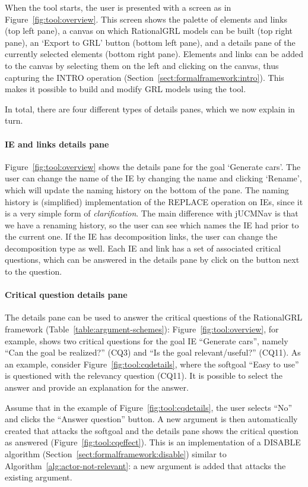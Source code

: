 When the tool starts, the user is presented with a screen as in Figure~\ref{fig:tool:overview}. This screen shows the palette of elements and links (top left pane), a canvas on which RationalGRL models can be built (top right pane), an `Export to GRL' button (bottom left pane), and a details pane of the currently selected elements (bottom right pane). Elements and links can be added to the canvas by selecting them on the left and clicking on the canvas, thus capturing the \textsf{INTRO} operation (Section~\ref{sect:formalframework:intro}). This makes it possible to build and modify GRL models using the tool. 

In total, there are four different types of details panes, which we now explain in turn.

\paragraph{IE and links details pane} Figure~\ref{fig:tool:overview} shows the details pane for the goal `Generate cars'. The user can change the name of the IE by changing the name and clicking `Rename', which will update the naming history on the bottom of the pane. The naming history is (simplified) implementation of the \textsf{REPLACE} operation on IEs, since it is a very simple form of \emph{clarification}. The main difference with jUCMNav is that we have a renaming history, so the user can see which names the IE had prior to the current one. If the IE has decomposition links, the user can change the decomposition type as well. Each IE and link has a set of associated critical questions, which can be answered in the details pane by click on the button next to the question.

\paragraph{Critical question details pane} The details pane can be used to answer the critical questions of the RationalGRL framework (Table~\ref{table:argument-schemes}): Figure~\ref{fig:tool:overview}, for example, shows two critical questions for the goal IE ``Generate cars'', namely ``Can the goal be realized?'' (CQ3) and ``Is the goal relevant/useful?'' (CQ11). As an example, consider Figure~\ref{fig:tool:cqdetails}, where the softgoal ``Easy to use'' is questioned with the relevancy question (CQ11). It is possible to select the answer and provide an explanation for the answer. 

Assume that in the example of Figure~\ref{fig:tool:cqdetails}, the user selects ``No'' and clicks the ``Answer question'' button. A new argument is then automatically created that attacks the softgoal and the details pane shows the critical question as answered (Figure~\ref{fig:tool:cqeffect}). This is an implementation of a \textsf{DISABLE} algorithm (Section~\ref{sect:formalframework:disable}) similar to Algorithm~\ref{alg:actor-not-relevant}: a new argument is added that attacks the existing argument. 

